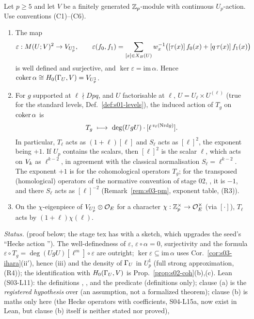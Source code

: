 \begin{theorem}\label{thm:s03-iharaH0}
Let $p\ge5$ and let $V$ be a finitely generated $\mathbb{Z}_p$-module with continuous $U_p$-action. Use conventions (C1)--(C6).
\begin{enumerate}[label=(\alph*)]
\item The map
  \[\varepsilon:M(U;V)^2\to V_{U^1_p},\qquad \varepsilon(f_0,f_1)=\sum_{[x]\in X_B(U)}w_x^{-1}\big([\tau(x)]\,f_0(x)+[q\,\tau(x)]\,f_1(x)\big)\]
  is well defined and surjective, and $\ker\varepsilon=\mathrm{im}\,\alpha$. Hence $\operatorname{coker}\alpha\cong H_0(\Gamma_U,V)=V_{U^1_p}$.
\item For $g$ supported at $\ell\nmid Dpq$, and $U$ factorisable at $\ell$, $U=U_\ell\times U^{(\ell)}$ (true for the standard levels,
  Def.~\ref{def:s01-levels}), the induced action of $T_g$ on $\operatorname{coker}\alpha$ is
  \[T_g\ \longmapsto\ \deg(UgU)\cdot[\ell^{\,v_\ell(\Nrd g)}].\]
  In particular, $T_\ell$ acts as $(1+\ell)[\ell]$ and $S_\ell$ acts as $[\ell]^2$, the exponent being $+1$. If $U_p$ contains
  the scalars, then $[\ell]^2$ is the scalar $\ell$, which acts on $V_k$ as $\ell^{k-2}$, in agreement with the classical
  normalisation $S_\ell=\ell^{k-2}$. The exponent $+1$ is for the cohomological operators $T_g$; for the transposed (homological) operators of the normative convention of stage 02, , it is $-1$, and there $S_\ell$ acts as $[\ell]^{-2}$ (Remark~\ref{rem:s03-pm},
  exponent table, (R3)).
\item On the $\chi$-eigenpiece of $V_{U^1_p}\otimes\mathcal{O}_E$ for a character $\chi:\mathbb{Z}_p^\times\to\mathcal{O}_E^\times$ (via $[\cdot]$), $T_\ell$ acts by
  $(1+\ell)\chi(\ell)$.
\end{enumerate}
\emph{Status.} \stpmc{} (proof below; the stage tex has \sttoprove{} with a sketch, which upgrades the seed's ``Hecke action \stsketch''). The
well-definedness of $\varepsilon$, $\varepsilon\circ\alpha=0$, surjectivity and the formula $\varepsilon\circ T_g=\deg(UgU)[\ell^m]\circ\varepsilon$ are \stproved{}
outright; $\ker\varepsilon\subseteq\mathrm{im}\,\alpha$ uses Cor.~\ref{cor:s03-ihara}(ii$'$), hence (iii) and the density of $\Gamma_U$ in $U^1_p$ (full strong
approximation, (R4)); the identification with $H_0(\Gamma_U,V)$ is Prop.~\ref{prop:s02-coh}(b),(c). Lean (S03-L11): the definitions , ,  and the predicate
 \stformal{} (definitions only); clause (a) is the \emph{registered hypothesis}  over
 (an assumption, not a formalized theorem); clause (b) is
maths only here (the Hecke operators with coefficients, S04-L15a, now exist in Lean, but clause (b) itself is neither stated nor proved), \leanplanned
\end{theorem}
